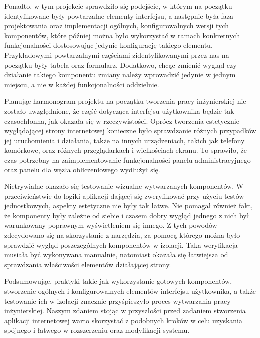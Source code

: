 \documentclass[a4paper,11pt,twoside]{report}
\theoremstyle{definition}
\begin{document}
            Ponadto, w tym projekcie sprawdziło się podejście, w którym na początku identyfikowane były powtarzalne elementy interfejsu, a następnie była faza projektowania oraz implementacji ogólnych, konfigurowalnych wersji tych komponentów, które później można było wykorzystać w ramach konkretnych funkcjonalności dostosowując jedynie konfigurację takiego elementu.
            Przykładowymi powtarzalnymi częściami zidentyfikowanymi przez nas na początku były tabela oraz formularz. Dodatkowo, chcąc zmienić wygląd czy działanie takiego komponentu zmiany należy wprowadzić jedynie w jednym miejscu, a nie w każdej funkcjonalności oddzielnie.
        
            Planując harmonogram projektu na początku tworzenia pracy inżynierskiej nie zostało uwzględnione, że część dotycząca interfejsu użytkownika będzie tak czasochłonna, jak okazała się w rzeczywistości.
            Oprócz tworzenia estetycznie wyglądającej strony internetowej konieczne było sprawdzanie różnych przypadków jej uruchomienia i działania, także na innych urządzeniach, takich jak telefony komórkowe, oraz różnych przeglądarkach i wielkościach ekranu. To sprawiło, że czas potrzebny na zaimplementowanie funkcjonalności panelu administracyjnego oraz panelu dla węzła obliczeniowego wydłużył się.
            
            Nietrywialne okazało się testowanie wizualne wytwarzanych komponentów. W przeciwieństwie do logiki aplikacji dającej się zweryfikować przy użyciu testów jednostkowych, aspekty estetyczne nie były tak łatwe. Nie pomagał również fakt, że komponenty były zależne od siebie i czasem dobry wygląd jednego z nich był warunkowany poprawnym wyświetleniem się innego.
            Z tych powodów zdecydowano się na skorzystanie z narzędzia, za pomocą którego można było sprawdzić wygląd poszczególnych komponentów w izolacji. Taka weryfikacja musiała być wykonywana manualnie, natomiast okazała się łatwiejsza od sprawdzania właściwości elementów działającej strony.
            
            Podsumowując, praktyki takie jak wykorzystanie gotowych komponentów, stworzenie ogólnych i konfigurowalnych elementów interfejsu użytkownika, a także testowanie ich w izolacji znacznie przyśpieszyło proces wytwarzania pracy inżynierskiej.
            Naszym zdaniem stojąc w przyszłości przed zadaniem stworzenia aplikacji internetowej warto skorzystać z podobnych kroków w celu uzyskania spójnego i łatwego w rozszerzeniu oraz modyfikacji systemu.
        
\end{document}
